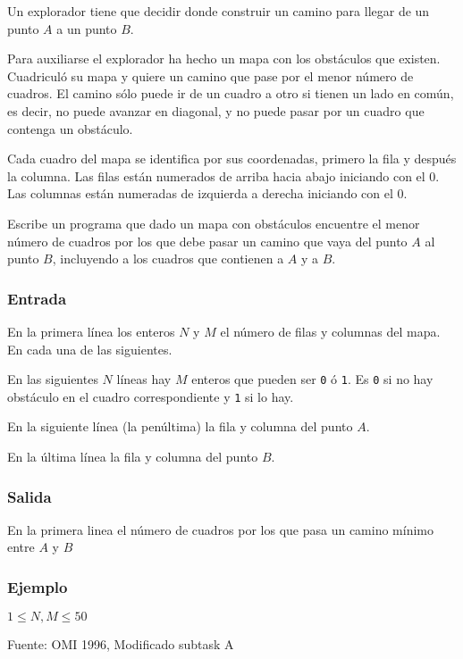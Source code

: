 Un explorador tiene que decidir donde construir un camino para llegar de un punto \(A\) a un punto \(B\). 

Para auxiliarse el explorador ha hecho un mapa con los obstáculos que existen. Cuadriculó su mapa y quiere un camino que pase por el menor número de cuadros. El camino sólo puede ir de un cuadro a otro si tienen un lado en común, es decir, no puede avanzar en diagonal, y no puede pasar por un cuadro que contenga un obstáculo. 

Cada cuadro del mapa se identifica por sus coordenadas, primero la fila y después la columna. Las filas están numerados de arriba hacia abajo iniciando con el \(0\). Las columnas están numeradas de izquierda a derecha iniciando con el \(0\).

Escribe un programa que dado un mapa con obstáculos encuentre el menor número de cuadros por los que debe pasar un camino que vaya del punto \(A\) al punto \(B\), incluyendo a los cuadros que contienen a \(A\) y a \(B\).

\subsubsection*{Entrada}
En la primera línea los enteros \(N\) y \(M\) el número de filas y columnas del mapa. En cada una de las siguientes.

En las siguientes \(N\) líneas hay \(M\) enteros que pueden ser \verb|0| ó \verb|1|. Es \verb|0| si no hay obstáculo en el cuadro correspondiente y \verb|1| si lo hay.

En la siguiente línea (la penúltima) la fila y columna del punto \(A\).

En la última línea la fila y columna del punto \(B\).

\subsubsection*{Salida}
En la primera linea el número de cuadros por los que pasa un camino mínimo entre \(A\) y \(B\)

\subsubsection*{Ejemplo}
\begin{casebox2}
\end{casebox2}

\begin{plimits}
	\item \(1 \leq N, M\leq 50\)
\end{plimits}

Fuente: OMI 1996, Modificado subtask A

